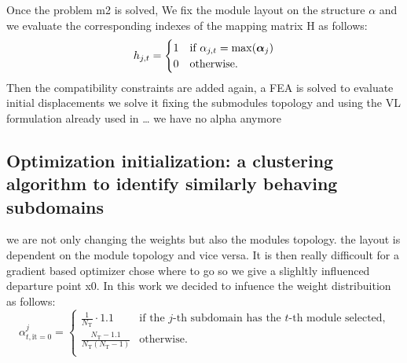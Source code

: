 Once the problem m2 is solved, We fix the module layout on the structure $\alpha$ and we evaluate the corresponding indexes of the mapping matrix H as follows:
\begin{equation}
    h_{j,t} =
    \begin{cases}
      1 & \text{if $\alpha_{j,t} = \max(\bm{\alpha}_{j})$} \\
      0 & \text{otherwise.} 
    \end{cases}
\end{equation}
Then the compatibility constraints are added again, a FEA is solved to evaluate initial displacements
we solve it fixing the submodules topology and using the VL formulation already used in \dots
we have no alpha anymore
\subsection{Optimization initialization: a clustering algorithm to identify similarly behaving subdomains}
we are not only changing the weights but also the modules topology.  the layout is dependent on the module topology and vice versa. It is then really difficoult for a gradient based optimizer chose where to go so we give a slighltly influenced departure point x0. In this work we decided to infuence the weight distribuition as follows:
\begin{equation}
    \alpha_{t,\text{it}=0}^j=
    \begin{cases}
        \frac{1}{N_\text{T}} \cdot 1.1  & \text{if the $j$-th subdomain has the  $t$-th module selected,}\\
        \frac{N_\text{T}-1.1}{N_\text{T}(N_\text{T}-1)} & \text{otherwise.} \\
    \end{cases}  
\end{equation}

